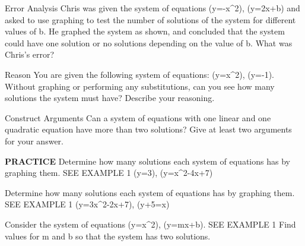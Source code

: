 \documentclass{article}
\newenvironment{practice}[2]{}{}        %
\newcommand{\answer}[1]{}               %
\newcommand{\placeholder}[2]{}          %
\newcommand{\te}[1]{}                   %
\begin{document}
\begin{practice}{8}{2}
Error Analysis Chris was given the system of equations (y=-x^2), (y=2x+b) and asked to use graphing to test the number of solutions of the system for different values of b. He graphed the system as shown, and concluded that the system could have one solution or no solutions depending on the value of b. What was Chris's error?
\placeholder{graph}{Blue downward parabola labeled (y=-x^2), vertex (0,0); red increasing line labeled (y=2x+3), no intersection; green line labeled (y=2x+1), tangent at (-1,-1). Both line ends and parabola ends arrowed. Grid x=[-6,6], y=[-12,10], spacing 1 horizontally and 2 vertically; x labels -4,-2,O,2,4 and y labels -8,-4,4,8. Black arrowed x,y axes.}
\answer{He did not check values for b that were less than 1.}
\end{practice}
\begin{practice}{9}{2}
Reason You are given the following system of equations: (y=x^2), (y=-1). Without graphing or performing any substitutions, can you see how many solutions the system must have? Describe your reasoning.
\answer{The system must have no solutions, since all y-values will be positive for the first equation but (y=-1) for all x's in the second equation.}
\te{Printed ``positive'' includes the zero value at x=0; likely ``nonnegative.''}
\end{practice}
\begin{practice}{10}{2}
Construct Arguments Can a system of equations with one linear and one quadratic equation have more than two solutions? Give at least two arguments for your answer.
\answer{No; this can be seen graphically, and by the fact that the system reduces to one quadratic equation, which never has more than two solutions.}
\end{practice}
\begin{practice}{11}{1}
\textbf{PRACTICE} Determine how many solutions each system of equations has by graphing them. SEE EXAMPLE 1
(y=3), (y=x^2-4x+7)
\answer{1 solution}
\end{practice}
\begin{practice}{12}{1}
Determine how many solutions each system of equations has by graphing them. SEE EXAMPLE 1
(y=3x^2-2x+7), (y+5=x)
\answer{no solutions}
\end{practice}
\begin{practice}{13}{2}
Consider the system of equations (y=x^2), (y=mx+b). SEE EXAMPLE 1
Find values for m and b so that the system has two solutions.
\answer{Answers may vary. Sample: (m=1), (b=2)}
\end{practice}
\end{document}
